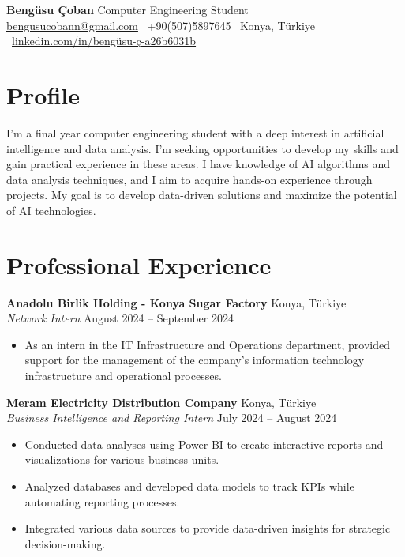 \documentclass[10pt,a4paper]{extarticle}
\begin{document}
\begin{center}
    \begin{minipage}{\textwidth}
        \centering
        {\LARGE\textbf{Bengüsu Çoban}} \hspace{2pt} {\LARGE{Computer Engineering Student}}\\[10pt]
        \href{mailto:bengusucobann@gmail.com}{bengusucobann@gmail.com} \textbullet\
        +90(507)5897645 \textbullet\
        Konya, Türkiye \textbullet\
        \href{https://linkedin.com/in/bengüsu-ç-a26b6031b}{linkedin.com/in/bengüsu-ç-a26b6031b}
    \end{minipage}
\end{center}
\section{Profile}
I'm a final year computer engineering student with a deep interest in artificial intelligence and data analysis. I'm seeking opportunities to develop my skills and gain practical experience in these areas. I have knowledge of AI algorithms and data analysis techniques, and I aim to acquire hands-on experience through projects. My goal is to develop data-driven solutions and maximize the potential of AI technologies.

\section{Professional Experience}
\textbf{Anadolu Birlik Holding - Konya Sugar Factory} \hfill Konya, Türkiye\\
\textit{Network Intern} \hfill August 2024 -- September 2024
\begin{itemize}[leftmargin=*,noitemsep,topsep=0pt]
    \item As an intern in the IT Infrastructure and Operations department, provided support for the management of the company's information technology infrastructure and operational processes.
\end{itemize}

\textbf{Meram Electricity Distribution Company} \hfill Konya, Türkiye\\
\textit{Business Intelligence and Reporting Intern} \hfill July 2024 -- August 2024
\begin{itemize}[leftmargin=*,noitemsep,topsep=0pt]
    \item Conducted data analyses using Power BI to create interactive reports and visualizations for various business units.
    \item Analyzed databases and developed data models to track KPIs while automating reporting processes.
    \item Integrated various data sources to provide data-driven insights for strategic decision-making.
\end{itemize}
\end{document}
